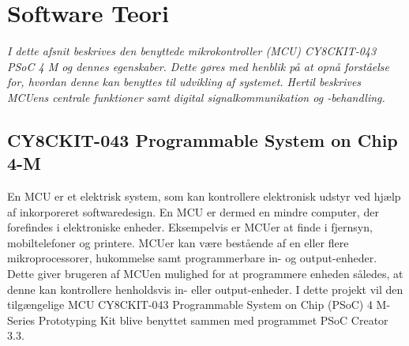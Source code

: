 \section{Software Teori}
\textit{I dette afsnit beskrives den benyttede mikrokontroller (MCU) CY8CKIT-043 PSoC 4 M og dennes egenskaber. Dette gøres med henblik på at opnå forståelse for, hvordan denne kan benyttes til udvikling af systemet. Hertil beskrives MCUens centrale funktioner samt digital signalkommunikation og -behandling.}

\subsection{CY8CKIT-043 Programmable System on Chip 4-M}
En MCU er et elektrisk system, som kan kontrollere elektronisk udstyr ved hjælp af inkorporeret softwaredesign. En MCU er dermed en mindre computer, der forefindes i elektroniske enheder. Eksempelvis er MCUer at finde i fjernsyn, mobiltelefoner og printere. \citep{Scienceuddannelse,Tanenbaum2006} \newline
MCUer kan være bestående af en eller flere mikroprocessorer, hukommelse samt programmerbare in- og output-enheder. Dette giver brugeren af MCUen mulighed for at programmere enheden således, at denne kan kontrollere henholdsvis in- eller output-enheder. \citep{Scienceuddannelse,Tanenbaum2006} I dette projekt vil den tilgængelige MCU CY8CKIT-043 Programmable System on Chip (PSoC) 4 M-Series Prototyping Kit blive benyttet sammen med programmet PSoC Creator 3.3.

